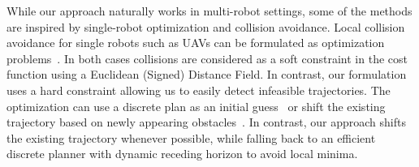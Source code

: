 \documentclass{svproc}
\begin{document}
While our approach naturally works in multi-robot settings, some of the methods are inspired by single-robot optimization and collision avoidance.
Local collision avoidance for single robots such as UAVs can be formulated as optimization problems~\cite{replanning-eth,replanning-usenko}.
In both cases collisions are considered as a soft constraint in the cost function using a Euclidean (Signed) Distance Field.
In contrast, our formulation uses a hard constraint allowing us to easily detect infeasible trajectories.
The optimization can use a discrete plan as an initial guess~\cite{replanning-eth} or shift the existing trajectory based on newly appearing obstacles~\cite{replanning-usenko}.
In contrast, our approach shifts the existing trajectory whenever possible, while falling back to an efficient discrete planner with dynamic receding horizon to avoid local minima.






\end{document}
